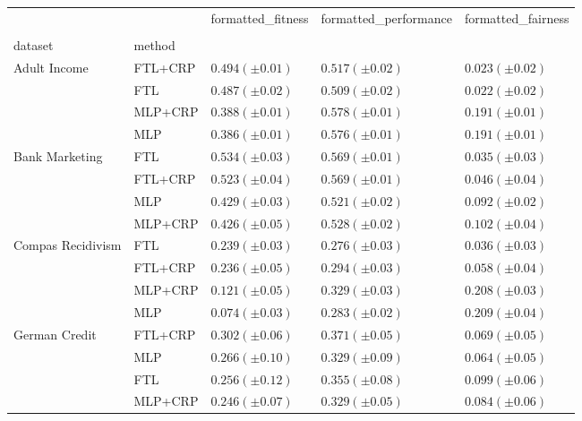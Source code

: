 \begin{tabular}{lllll}
\toprule
 &  & formatted_fitness & formatted_performance & formatted_fairness \\
 &  &  &  &  \\
dataset & method &  &  &  \\
\midrule
\multirow[t]{4}{*}{Adult Income} & FTL+CRP & $0.494 (\pm0.01)$ & $0.517 (\pm0.02)$ & $0.023 (\pm0.02)$ \\
 & FTL & $0.487 (\pm0.02)$ & $0.509 (\pm0.02)$ & $0.022 (\pm0.02)$ \\
 & MLP+CRP & $0.388 (\pm0.01)$ & $0.578 (\pm0.01)$ & $0.191 (\pm0.01)$ \\
 & MLP & $0.386 (\pm0.01)$ & $0.576 (\pm0.01)$ & $0.191 (\pm0.01)$ \\
\cline{1-5}
\multirow[t]{4}{*}{Bank Marketing} & FTL & $0.534 (\pm0.03)$ & $0.569 (\pm0.01)$ & $0.035 (\pm0.03)$ \\
 & FTL+CRP & $0.523 (\pm0.04)$ & $0.569 (\pm0.01)$ & $0.046 (\pm0.04)$ \\
 & MLP & $0.429 (\pm0.03)$ & $0.521 (\pm0.02)$ & $0.092 (\pm0.02)$ \\
 & MLP+CRP & $0.426 (\pm0.05)$ & $0.528 (\pm0.02)$ & $0.102 (\pm0.04)$ \\
\cline{1-5}
\multirow[t]{4}{*}{Compas Recidivism} & FTL & $0.239 (\pm0.03)$ & $0.276 (\pm0.03)$ & $0.036 (\pm0.03)$ \\
 & FTL+CRP & $0.236 (\pm0.05)$ & $0.294 (\pm0.03)$ & $0.058 (\pm0.04)$ \\
 & MLP+CRP & $0.121 (\pm0.05)$ & $0.329 (\pm0.03)$ & $0.208 (\pm0.03)$ \\
 & MLP & $0.074 (\pm0.03)$ & $0.283 (\pm0.02)$ & $0.209 (\pm0.04)$ \\
\cline{1-5}
\multirow[t]{4}{*}{German Credit} & FTL+CRP & $0.302 (\pm0.06)$ & $0.371 (\pm0.05)$ & $0.069 (\pm0.05)$ \\
 & MLP & $0.266 (\pm0.10)$ & $0.329 (\pm0.09)$ & $0.064 (\pm0.05)$ \\
 & FTL & $0.256 (\pm0.12)$ & $0.355 (\pm0.08)$ & $0.099 (\pm0.06)$ \\
 & MLP+CRP & $0.246 (\pm0.07)$ & $0.329 (\pm0.05)$ & $0.084 (\pm0.06)$ \\
\cline{1-5}
\bottomrule
\end{tabular}
